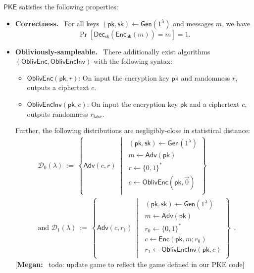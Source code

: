 \documentclass[11pt,letterpaper]{article}
\renewcommand{\emph}[1]{\textbf{#1}~}
\newcommand{\authnote}[2]{[{\color{red}\textbf{#1:}}~{\color{blue} #2}]}
\newcommand{\authnote}[2]{}
\newcommand{\megan}[1]{\authnote{Megan}{#1}}
\theoremstyle{plain} %
\theoremstyle{definition} %
\theoremstyle{remark} %
\newcommand{\eqdef}{\ {:=} \ }
\newcommand{\SecParam}{\lambda}
\newcommand{\PKE}{\mathsf{PKE}}
\newcommand{\Gen}{\mathsf{Gen}}
\newcommand{\Enc}{\mathsf{Enc}}
\newcommand{\OblivEnc}{\mathsf{OblivEnc}}
\newcommand{\OblivEncInv}{\mathsf{OblivEncInv}}
\newcommand{\Dec}{\mathsf{Dec}}
\newcommand{\EncKey}{\mathsf{pk}}
\newcommand{\DecKey}{\mathsf{sk}}
\newcommand{\Msg}{m}
\newcommand{\Ciphertext}{c}
\newcommand{\Rand}{r}
\newcommand{\FakeRand}{r_{\mathsf{fake}}}
\newcommand{\Distribution}{\mathcal{D}}
\newcommand{\Adversary}{{\mathsf{Adv}}} %
\newcommand{\pST}{\; \middle| \;}
\newcommand{\Bits}{\{0,1\}}
\begin{document}
$\PKE$ satisfies the following properties:
\begin{itemize}
    \item \emph{Correctness.} For all keys $(\EncKey, \DecKey) \gets \Gen(1^{\SecParam})$ and messages $\Msg$, we have
    \[ \Pr[ \Dec_{\DecKey} (\Enc_{\EncKey} (\Msg)) = \Msg ] = 1. \]

    \item \emph{Obliviously-sampleable.} There additionally exist algorithms $(\OblivEnc, \OblivEncInv)$ with the following syntax:
    \begin{itemize}
    	\item $\OblivEnc(\EncKey,\Rand)$: On input the encryption key $\EncKey$ and randomness $\Rand$, outputs a ciphertext $\Ciphertext$.
    	\item $\OblivEncInv(\EncKey,\Ciphertext)$: On input the encryption key $\EncKey$ and a ciphertext $\Ciphertext$, outputs randomness $\FakeRand$.
    \end{itemize}

    Further, the following distributions are negligibly-close in statistical distance:
    \begin{align*}
		&\Distribution_0(\SecParam) \eqdef \left\{
		\Adversary(\Ciphertext,\Rand)
		\pST
		\begin{array}{r}
            (\EncKey,\DecKey)\gets \Gen(1^\SecParam)\\
			\Msg \gets \Adversary(\EncKey)\\
            \Rand \gets \Bits^{*}\\
			\Ciphertext \gets \OblivEnc(\EncKey,\vec{0})\\
		\end{array}
		\right\} \\
		&\text{and } \Distribution_1(\SecParam) \eqdef \left\{
		\Adversary(\Ciphertext,\Rand_1)
		\pST
		\begin{array}{r}
            (\EncKey,\DecKey)\gets \Gen(1^\SecParam)\\
            \Msg \gets \Adversary(\EncKey)\\
            \Rand_0 \gets \Bits^{*}\\
            \Ciphertext \gets \Enc(\EncKey,\Msg;\Rand_0)\\
			\Rand_1 \gets \OblivEncInv(\EncKey,\Ciphertext)\\
		\end{array}
		\right\} \enspace.
	\end{align*}
    \megan{todo: update game to reflect the game defined in our PKE code}
\end{itemize}
\end{document}
